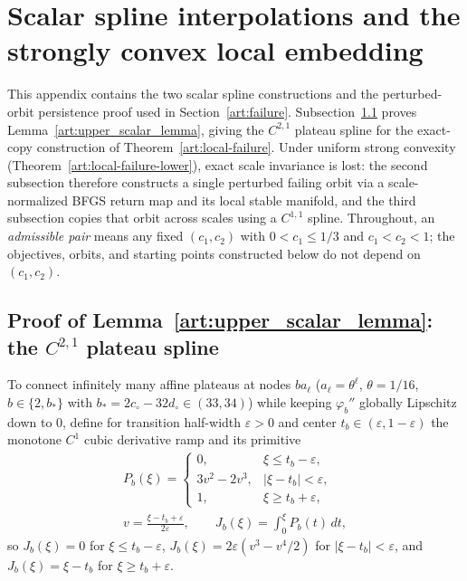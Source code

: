 \section{Scalar spline interpolations and the strongly convex local embedding}
\label{art:lower_curvature}

This appendix contains the two scalar spline constructions and the
perturbed-orbit persistence proof used in Section~\ref{art:failure}.
Subsection~\ref{art:upper_spline_subsec} proves
Lemma~\ref{art:upper_scalar_lemma}, giving the $C^{2,1}$ plateau spline for the
exact-copy construction of Theorem~\ref{art:local-failure}. Under uniform strong
convexity (Theorem~\ref{art:local-failure-lower}), exact scale invariance is
lost: the second subsection therefore constructs a single perturbed failing
orbit via a scale-normalized BFGS return map and its local stable manifold, and
the third subsection copies that orbit across scales using a $C^{1,1}$ spline.
Throughout, an \emph{admissible pair} means any
fixed $(c_1,c_2)$ with $0<c_1\le1/3$ and $c_1<c_2<1$; the objectives, orbits,
and starting points constructed below do not depend on $(c_1,c_2)$.

\subsection{Proof of Lemma~\ref{art:upper_scalar_lemma}: the $C^{2,1}$ plateau spline}\label{art:upper_spline_subsec}

To connect infinitely many affine plateaus at nodes $ba_\ell$ ($a_\ell=\theta^\ell$,
$\theta=1/16$, $b\in\{2,b_*\}$ with $b_*=2c_\circ-32d_\circ\in(33,34)$) while
keeping $\varphi_b''$ globally Lipschitz down to $0$, define for transition
half-width $\varepsilon>0$ and center $t_b\in(\varepsilon,1-\varepsilon)$ the
monotone $C^1$ cubic derivative ramp and its primitive
\begin{gather*}
 P_b(\xi)=
 \begin{cases}
 0,&\xi\le t_b-\varepsilon,\\
 3v^2-2v^3,&|\xi-t_b|<\varepsilon,\\
 1,&\xi\ge t_b+\varepsilon,
 \end{cases}\\
 v=\frac{\xi-t_b+\varepsilon}{2\varepsilon},
 \qquad J_b(\xi)=\int_0^\xi P_b(t)\,dt,
\end{gather*}
so $J_b(\xi)=0$ for $\xi\le t_b-\varepsilon$, $J_b(\xi)=2\varepsilon(v^3-v^4/2)$
for $|\xi-t_b|<\varepsilon$, and $J_b(\xi)=\xi-t_b$ for $\xi\ge t_b+\varepsilon$.

